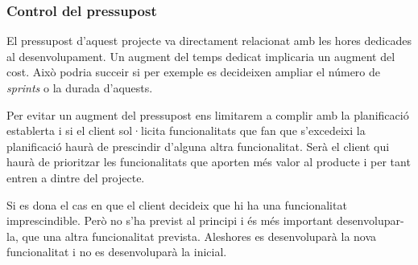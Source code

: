 \subsubsection{Control del pressupost}

El pressupost d'aquest projecte va directament relacionat amb les hores dedicades al desenvolupament. Un augment del temps dedicat implicaria un augment del cost. Això podria succeir si per exemple es decideixen ampliar el número de \textit{sprints} o la durada d'aquests.

Per evitar un augment del pressupost ens limitarem a complir amb la planificació establerta i si el client sol·licita funcionalitats que fan que s'excedeixi la planificació haurà de prescindir d'alguna altra funcionalitat. Serà el client qui haurà de prioritzar les funcionalitats que aporten més valor al producte i per tant entren a dintre del projecte.

Si es dona el cas en que el client decideix que hi ha una funcionalitat imprescindible. Però no s'ha previst al principi i és més important desenvolupar-la, que una altra funcionalitat prevista. Aleshores es desenvoluparà la nova funcionalitat i no es desenvoluparà la inicial.